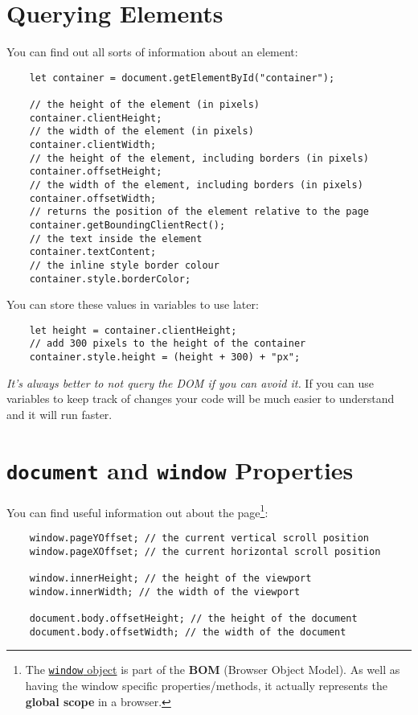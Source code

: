 \section{Querying Elements}

You can find out all sorts of information about an element:

\begin{verbatim}
    let container = document.getElementById("container");

    // the height of the element (in pixels)
    container.clientHeight;
    // the width of the element (in pixels)
    container.clientWidth;
    // the height of the element, including borders (in pixels)
    container.offsetHeight;
    // the width of the element, including borders (in pixels)
    container.offsetWidth;
    // returns the position of the element relative to the page
    container.getBoundingClientRect();
    // the text inside the element
    container.textContent;
    // the inline style border colour
    container.style.borderColor;
\end{verbatim}

You can store these values in variables to use later:

\begin{verbatim}
    let height = container.clientHeight;
    // add 300 pixels to the height of the container
    container.style.height = (height + 300) + "px";
\end{verbatim}

\textit{It's always better to not query the DOM if you can avoid it.} If you can use variables to keep track of changes your code will be much easier to understand and it will run faster.



\section{\texttt{document} and \texttt{window} Properties}

You can find useful information out about the page\footnote{The \href{https://developer.mozilla.org/en-US/docs/Web/API/Window}{\texttt{window} object} is part of the \textbf{BOM} (Browser Object Model). As well as having the window specific properties/methods, it actually represents the \textbf{global scope} in a browser.}:

\begin{verbatim}
    window.pageYOffset; // the current vertical scroll position
    window.pageXOffset; // the current horizontal scroll position

    window.innerHeight; // the height of the viewport
    window.innerWidth; // the width of the viewport

    document.body.offsetHeight; // the height of the document
    document.body.offsetWidth; // the width of the document
\end{verbatim}





